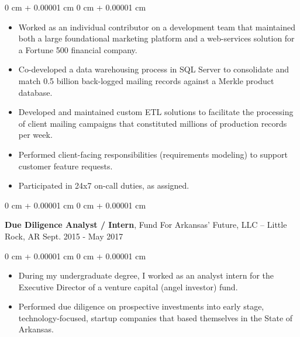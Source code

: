 \documentclass[10pt, letterpaper]{article}
\newenvironment{highlights}{
    \begin{itemize}[
        topsep=0.10 cm,
        parsep=0.10 cm,
        partopsep=0pt,
        itemsep=0pt,
        leftmargin=0 cm + 10pt
    ]
}{
    \end{itemize}
} %
\newenvironment{onecolentry}{
    \begin{adjustwidth}{
        0 cm + 0.00001 cm
    }{
        0 cm + 0.00001 cm
    }
}{
    \end{adjustwidth}
} %
\newenvironment{twocolentry}[2][]{
    \onecolentry
    \def\secondColumn{#2}
    \setcolumnwidth{\fill, 4.5 cm}
    \begin{paracol}{2}
}{
    \switchcolumn \raggedleft \secondColumn
    \end{paracol}
    \endonecolentry
} %
\begin{document}
        \vspace{0.10 cm}
        \begin{onecolentry}
            \begin{highlights}
                \item Worked as an individual contributor on a development team that maintained both a large foundational marketing platform and a web-services solution for a Fortune 500 financial company.
                \item Co-developed a data warehousing process in SQL Server to consolidate and match 0.5 billion back-logged mailing records against a Merkle product database.
                \item Developed and maintained custom ETL solutions to facilitate the processing of client mailing campaigns that constituted millions of production records per week.
                \item Performed client-facing responsibilities (requirements modeling) to support customer feature requests.
                \item Participated in 24x7 on-call duties, as assigned.
            \end{highlights}
        \end{onecolentry}

        \vspace{0.75 cm}

        \begin{twocolentry}{
            Sept. 2015 - May 2017
        }
            \textbf{Due Diligence Analyst / Intern}, Fund For Arkansas' Future, LLC -- Little Rock, AR\end{twocolentry}

        \vspace{0.10 cm}
        \begin{onecolentry}
            \begin{highlights}
                \item During my undergraduate degree, I worked as an analyst intern for the Executive Director of a venture capital (angel investor) fund.
                \item Performed due diligence on prospective investments into early stage, technology-focused, startup companies that based themselves in the State of Arkansas.
            \end{highlights}
        \end{onecolentry}

    \vspace{0.2 cm}
    
\end{document}
